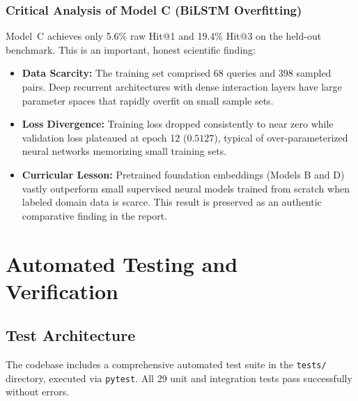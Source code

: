 \documentclass[12pt,a4paper]{report}
\begin{document}
\subsection{Critical Analysis of Model C (BiLSTM Overfitting)}
Model~C achieves only 5.6\% raw Hit@1 and 19.4\% Hit@3 on the held-out benchmark. This is an important, honest scientific finding:
\begin{itemize}
    \item \textbf{Data Scarcity:} The training set comprised 68 queries and 398 sampled pairs. Deep recurrent architectures with dense interaction layers have large parameter spaces that rapidly overfit on small sample sets.
    \item \textbf{Loss Divergence:} Training loss dropped consistently to near zero while validation loss plateaued at epoch 12 ($0.5127$), typical of over-parameterized neural networks memorizing small training sets.
    \item \textbf{Curricular Lesson:} Pretrained foundation embeddings (Models B and D) vastly outperform small supervised neural models trained from scratch when labeled domain data is scarce. This result is preserved as an authentic comparative finding in the report.
\end{itemize}

\chapter{Automated Testing and Verification}

\section{Test Architecture}
The codebase includes a comprehensive automated test suite in the \texttt{tests/} directory, executed via \texttt{pytest}. All 29 unit and integration tests pass successfully without errors.
\end{document}
